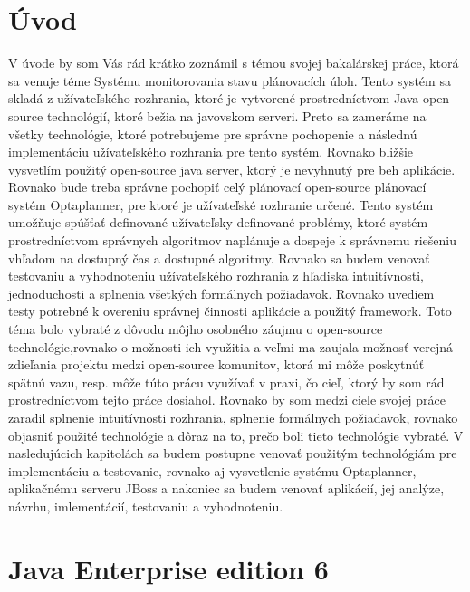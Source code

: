 

\chapter{Úvod}
V úvode by som Vás rád krátko zoznámil s témou svojej bakalárskej práce, ktorá sa venuje téme Systému monitorovania stavu plánovacích úloh. Tento systém sa skladá z užívateľského rozhrania, ktoré je vytvorené prostredníctvom Java open-source technológií, ktoré bežia na javovskom serveri. Preto sa zameráme na všetky technológie, ktoré potrebujeme pre správne pochopenie a následnú implementáciu užívateľského rozhrania pre tento systém. Rovnako bližšie vysvetlím použitý open-source java server, ktorý je nevyhnutý pre beh aplikácie. Rovnako bude treba správne pochopiť celý plánovací open-source plánovací systém Optaplanner, pre ktoré je užívateľské rozhranie určené. Tento systém umožňuje spúšťať definované užívateľsky definované problémy, ktoré systém prostredníctvom správnych algoritmov naplánuje a dospeje k správnemu riešeniu vhľadom na dostupný čas a dostupné algoritmy. Rovnako sa budem venovať testovaniu a vyhodnoteniu užívateľského rozhrania z hľadiska intuitívnosti, jednoduchosti a splnenia všetkých formálnych požiadavok. Rovnako uvediem testy potrebné k overeniu správnej činnosti aplikácie a použitý framework. Toto téma bolo vybraté z dôvodu môjho osobného záujmu o open-source technológie,rovnako o možnosti ich využitia a veľmi ma zaujala možnosť verejná zdieľania projektu medzi open-source komunitov, ktorá mi môže poskytnúť spätnú vazu, resp. môže túto prácu využívať v praxi, čo cieľ, ktorý by som rád prostredníctvom tejto práce dosiahol. Rovnako by som medzi ciele svojej práce zaradil splnenie intuitívnosti rozhrania, splnenie formálnych požiadavok, rovnako objasniť použité technológie a dôraz na to, prečo boli tieto technológie vybraté. V nasledujúcich kapitolách sa budem postupne venovať použitým technológiám pre implementáciu a testovanie, rovnako aj vysvetlenie systému Optaplanner, aplikačnému serveru JBoss a nakoniec sa budem venovať aplikácií, jej analýze, návrhu, imlementácií, testovaniu a vyhodnoteniu.






\chapter{Java Enterprise edition 6}
